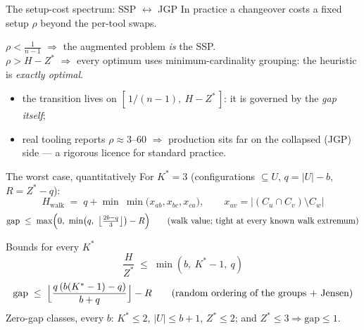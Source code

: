 \documentclass[10pt]{beamer}
\newcommand{\U}{U}\newcommand{\Kst}{K^{\ast}}\newcommand{\Zst}{Z^{\ast}}
\begin{document}
\begin{frame}{The setup-cost spectrum: SSP $\longleftrightarrow$ JGP}
In practice a changeover costs a fixed setup $\rho$ beyond the per-tool swaps.
\begin{theorem}
$\rho<\tfrac{1}{n-1}$ $\Rightarrow$ the augmented problem \emph{is} the SSP.\\
$\rho>H-\Zst$ $\Rightarrow$ every optimum uses minimum-cardinality grouping:
the heuristic is \emph{exactly optimal}.
\end{theorem}
\pause
\begin{itemize}
  \item the transition lives on $[\,1/(n-1),\ H-\Zst\,]$: it is governed by
        the \emph{gap itself};
  \item real tooling reports $\rho\approx3$--$60$ $\Rightarrow$ production
        sits far on the collapsed (JGP) side --- a rigorous licence for
        standard practice.
\end{itemize}
\end{frame}

\begin{frame}{The worst case, quantitatively}
For $\Kst=3$ (configurations $\subseteq\U$, $q=|\U|-b$, $R=\Zst-q$):
\[
  H_{\mathrm{walk}} \;=\; q+\min\ \min\bigl(x_{ab},x_{bc},x_{ca}\bigr),
  \qquad x_{uv}=\bigl|(C_u\cap C_v)\setminus C_w\bigr|
\]
\[
  \mathrm{gap}\;\le\;\max\Bigl(0,\ \min\bigl(q,\ \bigl\lfloor\tfrac{2b-q}{3}\bigr\rfloor\bigr)-R\Bigr)
  \qquad\text{(walk value; tight at every known walk extremum)}
\]
\end{frame}

\begin{frame}{Bounds for every $\Kst$}
\[
  \frac{H}{\Zst}\;\le\;\min(b,\ \Kst-1,\ q)
\]
\pause
\[
  \mathrm{gap}\;\le\;\Bigl\lfloor\frac{q\,(b(\Kst-1)-q)}{b+q}\Bigr\rfloor - R
  \qquad\text{(random ordering of the groups + Jensen)}
\]
\pause
Zero-gap classes, every $b$: \quad $\Kst\le2$, \quad $|\U|\le b+1$,
\quad $\Zst\le2$; \qquad and $\Zst\le3\Rightarrow\mathrm{gap}\le1$.
\end{frame}
\end{document}
